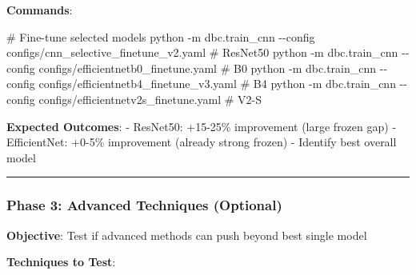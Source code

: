\documentclass[
  letterpaper,
  DIV=11,
  numbers=noendperiod]{scrartcl}
\newenvironment{Shaded}{\begin{snugshade}}{\end{snugshade}}
\newcommand{\AttributeTok}[1]{\textcolor[rgb]{0.40,0.45,0.13}{#1}}
\newcommand{\CommentTok}[1]{\textcolor[rgb]{0.37,0.37,0.37}{#1}}
\newcommand{\ExtensionTok}[1]{\textcolor[rgb]{0.00,0.23,0.31}{#1}}
\newcommand{\NormalTok}[1]{\textcolor[rgb]{0.00,0.23,0.31}{#1}}
\renewenvironment{Shaded}{%
  \begin{tcolorbox}[%
    enhanced,%
    colback=codebg,%
    colframe=codebg,%
    borderline west={3pt}{0pt}{sectionblue},%
    boxrule=0pt,%
    arc=0pt,%
    boxsep=5pt,%
    left=2mm,%
    right=2mm,%
    top=2mm,%
    bottom=2mm%
  ]%
}{%
  \end{tcolorbox}%
}
\begin{document}
\textbf{Commands}:

\begin{Shaded}
\begin{Highlighting}[]
\CommentTok{\# Fine{-}tune selected models}
\ExtensionTok{python} \AttributeTok{{-}m}\NormalTok{ dbc.train\_cnn }\AttributeTok{{-}{-}config}\NormalTok{ configs/cnn\_selective\_finetune\_v2.yaml      }\CommentTok{\# ResNet50}
\ExtensionTok{python} \AttributeTok{{-}m}\NormalTok{ dbc.train\_cnn }\AttributeTok{{-}{-}config}\NormalTok{ configs/efficientnetb0\_finetune.yaml        }\CommentTok{\# B0}
\ExtensionTok{python} \AttributeTok{{-}m}\NormalTok{ dbc.train\_cnn }\AttributeTok{{-}{-}config}\NormalTok{ configs/efficientnetb4\_finetune\_v3.yaml     }\CommentTok{\# B4}
\ExtensionTok{python} \AttributeTok{{-}m}\NormalTok{ dbc.train\_cnn }\AttributeTok{{-}{-}config}\NormalTok{ configs/efficientnetv2s\_finetune.yaml       }\CommentTok{\# V2{-}S}
\end{Highlighting}
\end{Shaded}

\textbf{Expected Outcomes}: - ResNet50: +15-25\% improvement (large
frozen gap) - EfficientNet: +0-5\% improvement (already strong frozen) -
Identify best overall model

\begin{center}\rule{0.5\linewidth}{0.5pt}\end{center}

\subsubsection{Phase 3: Advanced Techniques
(Optional)}\label{phase-3-advanced-techniques-optional}

\textbf{Objective}: Test if advanced methods can push beyond best single
model

\textbf{Techniques to Test}:
\end{document}
